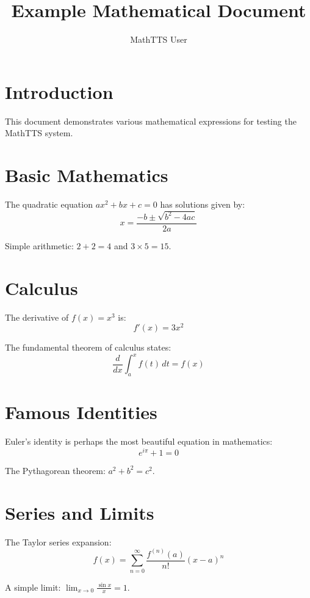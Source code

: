 \documentclass{article}
\title{Example Mathematical Document}
\author{MathTTS User}
\begin{document}
\maketitle

\section{Introduction}
This document demonstrates various mathematical expressions for testing the MathTTS system.

\section{Basic Mathematics}

The quadratic equation $ax^2 + bx + c = 0$ has solutions given by:
\begin{equation}
x = \frac{-b \pm \sqrt{b^2-4ac}}{2a}
\end{equation}

Simple arithmetic: $2 + 2 = 4$ and $3 \times 5 = 15$.

\section{Calculus}

The derivative of $f(x) = x^3$ is:
$$f'(x) = 3x^2$$

The fundamental theorem of calculus states:
\begin{equation}
\frac{d}{dx}\int_a^x f(t) \, dt = f(x)
\end{equation}

\section{Famous Identities}

Euler's identity is perhaps the most beautiful equation in mathematics:
\begin{equation}
e^{i\pi} + 1 = 0
\end{equation}

The Pythagorean theorem: $a^2 + b^2 = c^2$.

\section{Series and Limits}

The Taylor series expansion:
$$f(x) = \sum_{n=0}^{\infty} \frac{f^{(n)}(a)}{n!}(x-a)^n$$

A simple limit: $\lim_{x \to 0} \frac{\sin x}{x} = 1$.
\end{document}
